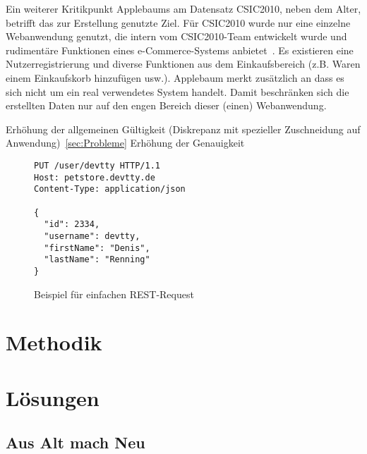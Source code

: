 Ein weiterer Kritikpunkt Applebaums am Datensatz CSIC2010, neben dem Alter, betrifft das zur Erstellung genutzte Ziel. Für CSIC2010 wurde nur eine einzelne Webanwendung genutzt, die intern vom CSIC2010-Team entwickelt wurde und rudimentäre Funktionen eines e-Commerce-Systems anbietet~\cite{csic2010}. Es existieren eine Nutzerregistrierung und diverse Funktionen aus dem Einkaufsbereich (z.B. Waren einem Einkaufskorb hinzufügen usw.). Applebaum merkt zusätzlich an dass es sich nicht um ein real verwendetes System handelt. Damit beschränken sich die erstellten Daten nur auf den engen Bereich dieser (einen) Webanwendung. 

Erhöhung der allgemeinen Gültigkeit (Diskrepanz mit spezieller Zuschneidung auf Anwendung)~\ref{sec:Probleme}
Erhöhung der Genauigkeit


      \begin{figure}
        \caption{Beispiel für einfachen REST-Request}
        \label{fig:restputexample}
      \begin{lstlisting}
PUT /user/devtty HTTP/1.1
Host: petstore.devtty.de
Content-Type: application/json

{
  "id": 2334,
  "username": devtty,
  "firstName": "Denis",
  "lastName": "Renning"
}
\end{lstlisting}
\end{figure}



\section{Methodik}


\section{Lösungen}

\subsection{Aus Alt mach Neu}

